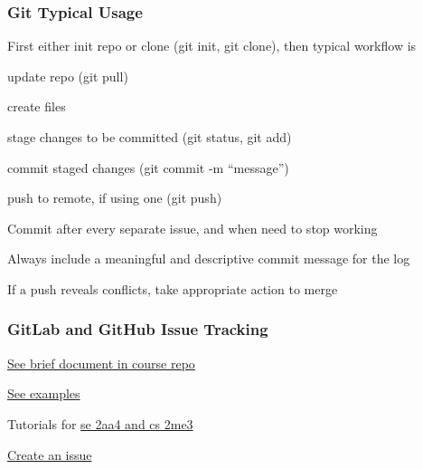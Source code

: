 \documentclass[t,12pt,numbers,fleqn]{beamer}
\begin{document}
\begin{frame}
\frametitle{Git Typical Usage}

First either init repo or clone (git init, git clone), then typical workflow is
\be
\item update repo (git pull)
\item create files
\item stage changes to be committed (git status, git add)
\item commit staged changes (git commit -m ``message'')
\item push to remote, if using one (git push)
\ee
\bi
\item Commit after every separate issue, and when need to stop working
\item Always include a meaningful and descriptive commit message for the log
\item If a push reveals conflicts, take appropriate action to merge
\ei
\end{frame}


\begin{frame}
\frametitle{GitLab and GitHub Issue Tracking}

\bi
\item \href{https://gitlab.cas.mcmaster.ca/smiths/cas741/tree/master/ToolTutorials/gitAndGitLab}{See brief document in course repo}
\item \href{https://github.com/JacquesCarette/literate-scientific-software/issues}{See
  examples}
\item Tutorials for
  \href{https://gitlab.cas.mcmaster.ca/smiths/se2aa4_cs2me3/tree/master/Tutorials/T01a-Git/slides}
  {se 2aa4 and cs 2me3}
\item \href{https://gitlab.cas.mcmaster.ca/smiths/cas741/issues}{Create an issue}
\ei

\end{frame}

\end{document}
